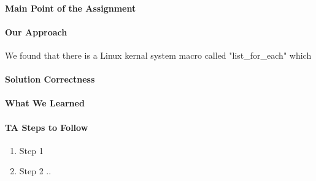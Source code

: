 \documentclass[titlepage,draftclsnofoot,onecolumn]{article}
\begin{document}
\paragraph{Main Point of the Assignment}

\paragraph{Our Approach}
We found that there is a Linux kernal system macro called "list_for_each" which 

\paragraph{Solution Correctness}

\paragraph{What We Learned}

\paragraph{TA Steps to Follow}

\begin{enumerate}
  \item Step 1
  \item Step 2 ..
\end{enumerate}
\end{document}
